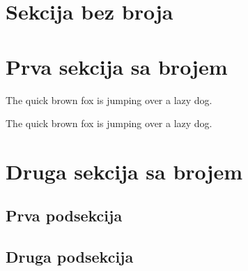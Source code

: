 \documentclass[11pt]{article}
\begin{document}
	\section*{Sekcija bez broja}

	\section{Prva sekcija sa brojem}

	The quick brown fox is jumping over a lazy dog.

	The quick brown fox is jumping over a lazy dog.

	\section{Druga sekcija sa brojem}

	\subsection{Prva podsekcija}

	\subsection{Druga podsekcija}
\end{document}
